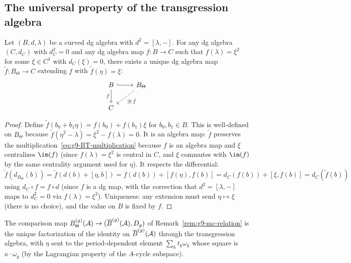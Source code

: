 %
%

\subsection{The universal property of the transgression algebra}
\label{subsec:universal-property}

\begin{proposition}
\label{prop:g9-universal}
Let $(B, d, \lambda)$ be a curved dg algebra with
$d^2 = [\lambda, -]$. For any dg algebra $(C, d_C)$ with
$d_C^2 = 0$ and any dg algebra map $f\colon B \to C$ such that
$f(\lambda) = \xi^2$ for some $\xi \in C^1$ with $d_C(\xi) = 0$,
there exists a unique dg algebra map $\tilde{f}\colon B_\Theta \to C$
extending $f$ with $\tilde{f}(\eta) = \xi$:
\[
\begin{tikzcd}
B \arrow[r, hook] \arrow[d, "f"'] &
B_\Theta \arrow[dl, dashed, "\exists!\,\tilde{f}"] \\
C &
\end{tikzcd}
\]
\end{proposition}

\begin{proof}
Define $\tilde{f}(b_0 + b_1\eta) = f(b_0) + f(b_1)\xi$ for
$b_0, b_1 \in B$. This is well-defined on $B_\Theta$ because
$\tilde{f}(\eta^2 - \lambda) = \xi^2 - f(\lambda) = 0$.
It is an algebra map: $\tilde{f}$ preserves the
multiplication~\eqref{eq:g9-BT-multiplication} because $f$ is an
algebra map and $\xi$ centralizes $\im(f)$ (since $f(\lambda) = \xi^2$
is central in $C$, and $\xi$ commutes with $\im(f)$ by the
same centrality argument used for $\eta$). It respects the
differential: $\tilde{f}(d_{B_\Theta}(b)) = \tilde{f}(d(b) +
[\eta, b]) = f(d(b)) + [f(\eta), f(b)] = d_C(f(b)) +
[\xi, f(b)] = d_C(\tilde{f}(b))$ using $d_C \circ f = f \circ d$
(since $f$ is a dg map, with the correction that $d^2 = [\lambda, -]$
maps to $d_C^2 = 0$ via $f(\lambda) = \xi^2$). Uniqueness: any
extension must send $\eta \mapsto \xi$ (there is no choice), and
the value on $B$ is fixed by $f$.
\end{proof}

\begin{corollary}
\label{cor:g9-comparison-universal}
The comparison map $B_\Theta^{(g)}(\mathcal{A}) \to (\overline{B}^{(g)}(\mathcal{A}),
D_{g})$ of Remark~\ref{rem:g9-mc-relation} is the unique factorization
of the identity on $\overline{B}^{(g)}(\mathcal{A})$ through the transgression
algebra, with $\eta$ sent to the period-dependent element
$\sum_k t_k \omega_k$ whose square is $\kappa \cdot \omega_g$ (by the
Lagrangian property of the $A$-cycle subspace).
\end{corollary}

